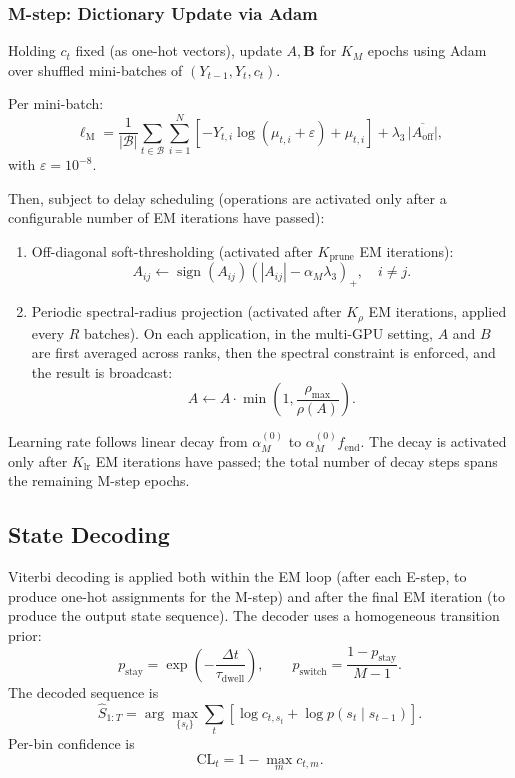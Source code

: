 \documentclass[11pt]{article}
\begin{document}
\subsubsection{M-step: Dictionary Update via Adam}

Holding \(c_t\) fixed (as one-hot vectors), update \(A,\mathbf{B}\) for \(K_M\) epochs using
Adam over shuffled mini-batches of \((Y_{t-1},Y_t,c_t)\).

Per mini-batch:
\begin{equation}
  \ell_{\mathrm{M}} =
  \frac{1}{|\mathcal{B}|}
  \sum_{t\in\mathcal{B}}\sum_{i=1}^{N}
  \left[-Y_{t,i}\log(\mu_{t,i}+\varepsilon)+\mu_{t,i}\right]
  + \lambda_3\,\overline{|A_{\mathrm{off}}|},
\end{equation}
with \(\varepsilon=10^{-8}\).

Then, subject to delay scheduling (operations are activated only after a configurable number of EM iterations have passed):
\begin{enumerate}
  \item Off-diagonal soft-thresholding (activated after \(K_{\mathrm{prune}}\) EM iterations):
  \[
    A_{ij}\leftarrow \operatorname{sign}(A_{ij})
    \left(|A_{ij}|-\alpha_M\lambda_3\right)_+,\quad i\neq j.
  \]
  \item Periodic spectral-radius projection (activated after \(K_{\rho}\) EM iterations, applied every \(R\) batches). On each application, in the multi-GPU setting, \(A\) and \(B\) are first averaged across ranks, then the spectral constraint is enforced, and the result is broadcast:
  \[
    A \leftarrow A\cdot \min\!\left(1,\frac{\rho_{\max}}{\rho(A)}\right).
  \]
\end{enumerate}

Learning rate follows linear decay from \(\alpha_M^{(0)}\) to
\(\alpha_M^{(0)}f_{\mathrm{end}}\). The decay is activated only after \(K_{\mathrm{lr}}\) EM iterations have passed; the total number of decay steps spans the remaining M-step epochs.

\subsection{State Decoding}
\label{sec:decode}

Viterbi decoding is applied both within the EM loop (after each E-step, to produce one-hot assignments for the M-step) and after the final EM iteration (to produce the output state sequence). The decoder uses a homogeneous transition prior:
\begin{equation}
  p_{\mathrm{stay}}=\exp\!\left(-\frac{\Delta t}{\tau_{\mathrm{dwell}}}\right),
  \qquad
  p_{\mathrm{switch}}=\frac{1-p_{\mathrm{stay}}}{M-1}.
\end{equation}
The decoded sequence is
\begin{equation}
  \hat{S}_{1:T}=\arg\max_{\{s_t\}}
  \sum_t\left[\log c_{t,s_t}+\log p(s_t\mid s_{t-1})\right].
\end{equation}
Per-bin confidence is
\[
\mathrm{CL}_t = 1-\max_m c_{t,m}.
\]
\end{document}
